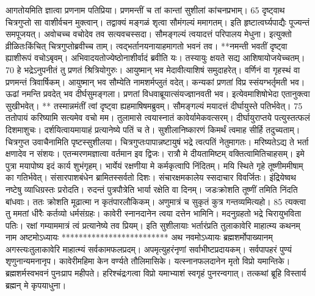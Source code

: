 आगतोयमिति ज्ञात्वा प्रणनाम पतिप्रिया।
 प्रणमन्तीं च तां कान्तां सुशीलां कांचनप्रभाम्।
 65 दृष्ट्वाथ चित्रगुप्तो सा वाशीर्वचन मुक्त्वान्।
 तद्वाक्यं मङ्गळं शृत्वा सौमंगल्यं ममागतम्।
 इति हृष्टात्वर्घ्यपाद्यैः पूज्यन्तं समपूजयत्।
 अवोचच्च वचोदेव तव सत्यवचस्सदा।
 सौमङ्गल्यं त्वयादत्तं परिपालय मेधुना।
 इत्युक्तो व्रीळितःकिंचित् चित्रगुप्तोब्रवीच्च ताम्।
 त्वद्भर्तानयनायाहमागतो भवनं तव।
 **नमन्ती भवतीं दृष्ट्वा ह्याशीरूपं वचोऽबृवम्।
 अभिवादयतोज्येष्ठोनाशीर्वादं ब्रवीति यः।
 तस्यायुः क्षयते सद्य आशिषायोजयेच्चतम्।
 70 हे भद्रेऽनुपनीतं तु प्रणतं श्रित्रियोगुरुः।
 आयुष्मान् भव मेदावीत्याशिषं समुदाहरेत्।
 वर्णिनं वा गृहस्थं वा प्रणमन्तं त्रिवार्षिकम्।
 आयुष्मान् भव सौम्येति नामशर्मप्लुतं वदेत्।
 कन्यकां प्रणतां विप्र स्संयग्भर्तृमती भव।
 ऊढां नमन्ति प्रवदेत् भव दीर्घसुमङ्गला।
 प्रणतां विधवाब्रूयात्संयज्ज्ञानवती भव।
 इत्येवमाशिषोभेदा एतानुक्त्वा सुखीभवेत्।
 ** तस्मान्नमंतीं त्वां दृष्ट्वा ह्यहमाषिषमब्रुवम्।
 सौमङ्गल्यं मयादत्तं दीर्घायुस्ते पतिर्भवेत्।
 75
ततोपायं करिष्यामि सत्यमेव वचो मम।
 तुलामासे त्वयास्नातं कावेर्यामेकवत्सरम्।
 दीर्घायुराप्तये पत्युस्तत्फलं दिशमाशुचः।
 दर्शयित्वायमायाहं प्रत्यानेष्ये पतिं च ते।
 सुशीलानिष्कारणं किमर्थं त्वमाह सीर्हि तदुच्यताम्।
 चित्रगुप्त उवाचैनामिति पृष्टस्सुशीलया।
 चित्रगुप्तःपापान्नष्टायुषं भद्रे त्वत्पतिं नेतुमागतः।
 मरिष्यतेऽद्य ते भर्ता क्षणादेव न संशयः।
 एतन्मरणमज्ञात्वा वर्तमान इव द्विजः।
 रात्रौ मे दीयतामिष्टम् वक्तित्वामितिचाहसम्।
 इमे पुत्रा मयापोष्य इदं कार्य शुभंगृहम्।
 भार्येयं रक्षणीया मे कर्मकृत्वापि निंदितम्।
 मयि स्थिते गृहे तूष्णीममीषाम् का गतिर्भवेत्।
 संसारपाशबंधेन ब्रामितस्सर्वतो दिशः।
 संचारक्षमकालेय स्सदाचार विवर्जितः।
 इंद्रियेष्वथ नष्टेषु व्याधिग्रस्तः प्ररोदति।
 रुदन्तं पुत्रपौत्रेति भार्या रक्षेति वा दिनम्।
 जडःक्रोशति तूष्णीं तमिति निंदति बांधवाः।
 ततः क्रोशति मूढात्मा न कृतंपारलौकिकम्।
 अणुमात्रं च सुकृतं कुत्र गन्तव्यमित्यहो।
 85
त्यक्त्वा तु ममतां धीरैः कर्तव्यो धर्मसंग्रहः।
 कावेरी स्नानदानेन त्वया दत्तेन भामिनि।
 मदनुग्रहतो भद्रे चिरायुभविता पतिः।
 रक्षां गम्याममात्रं त्वं प्रत्यानेष्ये तव प्रियम्।
 इति सुशीलायाः भर्तारंप्रति तुलाकावेरि माहात्म्य
कथनम् नाम अष्टमोऽध्यायः
*************************
अथ नवमोऽध्यायः
ब्रह्मशर्मोपाख्यानम् अगस्त्यःतुलाकावेरि माहात्म्यं सर्वकामफलप्रदम्।
 अपमृत्युहरंनृणां सर्वाभीष्टप्रदायकम्।
 सर्वपापहरं पुण्यं शृणुनान्यमनानृप।
 कावेरीमहिमा केन वर्ण्यते तौलिमासिके।
 यत्स्नानफलदानेन मृतो विप्रो यमान्तिके।
 ब्रह्मशर्मस्वभवनं पुनःप्राप महीपते।
 हरिश्चंद्रःगत्वा विप्रो यमाभ्याशं स्वगृहं पुनरन्वगात्।
 तत्कथां ब्रूहि विस्तार्य ब्रह्मन् मे कृपयाधुना।
 
